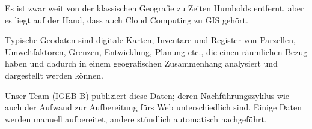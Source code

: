 Es ist zwar weit von der klassischen Geografie zu Zeiten Humbolds entfernt, aber es liegt auf der Hand, dass auch Cloud Computing zu GIS gehört.



Typische Geodaten sind digitale Karten, Inventare und Register von Parzellen, Umweltfaktoren, Grenzen, Entwicklung, Planung etc., die einen räumlichen Bezug haben und dadurch in einem geografischen Zusammenhang analysiert und dargestellt werden können.

Unser
Team (IGEB-B) publiziert diese Daten; deren Nachführungszyklus wie auch der Aufwand zur
Aufbereitung fürs Web unterschiedlich sind. Einige Daten werden manuell aufbereitet, andere
stündlich automatisch nachgeführt.

